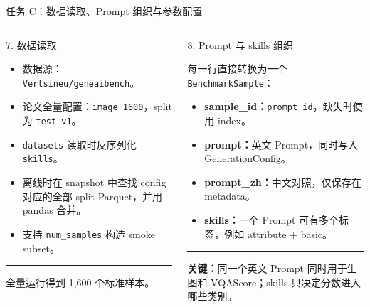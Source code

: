 \documentclass[aspectratio=169,10pt]{beamer}
\begin{document}
\begin{frame}{任务 C：数据读取、Prompt 组织与参数配置}
  \begin{columns}[T,onlytextwidth]
      \begin{block}{7. 数据读取}
        \begin{minipage}[c][5.05cm][c]{\linewidth}
          \begin{itemize}\scriptsize
            \item 数据源：\texttt{Vertsineu/geneaibench}。
            \item 论文全量配置：\texttt{image\_1600}，split 为 \texttt{test\_v1}。
            \item \texttt{datasets} 读取时反序列化 \texttt{skills}。
            \item 离线时在 snapshot 中查找 config 对应的全部 split Parquet，并用 pandas 合并。
            \item 支持 \texttt{num\_samples} 构造 smoke subset。
          \end{itemize}
          \vspace{0.45em}
          \color{T2IGray}\rule{\linewidth}{0.35pt}\par\vspace{0.3em}
          \scriptsize 全量运行得到 1,600 个标准样本。
        \end{minipage}
      \end{block}

      \begin{block}{8. Prompt 与 skills 组织}
        \begin{minipage}[c][5.05cm][c]{\linewidth}
          \scriptsize
          每一行直接转换为一个 \texttt{BenchmarkSample}：
          \begin{itemize}\scriptsize
            \item \textbf{sample\_id：}\texttt{prompt\_id}，缺失时使用 index。
            \item \textbf{prompt：}英文 Prompt，同时写入 GenerationConfig。
            \item \textbf{prompt\_zh：}中文对照，仅保存在 metadata。
            \item \textbf{skills：}一个 Prompt 可有多个标签，例如 attribute + basic。
          \end{itemize}
          \vspace{0.45em}
          \color{T2IGray}\rule{\linewidth}{0.35pt}\par\vspace{0.3em}
          \scriptsize\textbf{关键：}同一个英文 Prompt 同时用于生图和 VQAScore；skills 只决定分数进入哪些类别。
        \end{minipage}
      \end{block}


\end{columns}
\end{frame}
\end{document}
